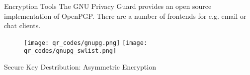 \documentclass[final,hyperref={pdfpagelabels=false}]{beamer}
\begin{document}
\begin{frame}{}
\begin{columns}[t]
\begin{column}{.3\linewidth}
        \begin{block}{Encryption Tools}
        The GNU Privacy Guard provides an open source implementation of OpenPGP. There are a number of frontends for e.g. email or chat clients.
        \begin{figure}
          \center
            \texttt{[image: qr\_codes/gnupg.png]} \hspace{20pt}
            \texttt{[image: qr\_codes/gnupg\_swlist.png]}
        \end{figure}
        \end{block}
        \begin{block}{Secure Key Destribution: Asymmetric Encryption}
          
        \end{block}
      \end{column}
    \end{columns}
  \end{frame}
\end{document}
